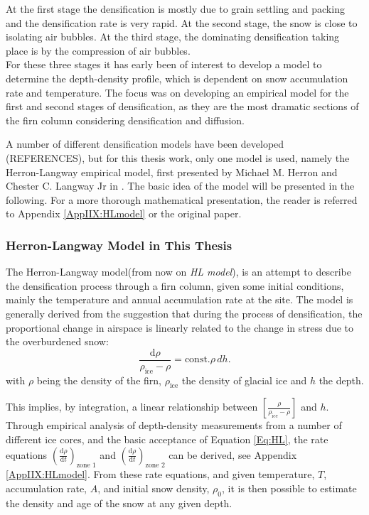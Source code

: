 \documentclass[../../CompleteThesis2/Complete_2ndDraft]{subfiles}
\begin{document}
At the first stage the densification is mostly due to grain settling and packing and the densification rate is very rapid. At the second stage, the snow is close to isolating air bubbles. At the third stage, the dominating densification taking place is by the compression of air bubbles.\\
For these three stages it has early been of interest to develop a model to determine the depth-density profile, which is dependent on snow accumulation rate and temperature. The focus was on developing an empirical model for the first and second stages of densification, as they are the most dramatic sections of the firn column considering densification and diffusion.

A number of different densification models have been developed (REFERENCES),  but for this thesis work, only one model is used, namely the Herron-Langway empirical model, first presented by Michael M. Herron and Chester C. Langway Jr in \cite[Herron and Langway, 1980]{HerronLangway1980}. The basic idea of the model will be presented in the following. For a more thorough mathematical presentation, the reader is referred to Appendix \ref{AppIIX:HLmodel} or the original paper.

\subsubsection[HL in This Thesis]{Herron-Langway Model in This Thesis}
\label{Subsubsec:Ice_DiffusionAndDensification_Densification_HLmodel}
The Herron-Langway model(from now on \textit{HL model}), is an attempt to describe the densification process through a firn column, given some initial conditions, mainly the temperature and annual accumulation rate at the site. The model is generally derived from the suggestion that during the process of densification, the proportional change in airspace is linearly related to the change in stress due to the overburdened snow:
\begin{equation}
	\frac{\text{d}\rho}{\rho_{\text{ice}} - \rho} = \text{const.} \rho \, dh.
	\label{Eq:HL}
\end{equation}
with $\rho$ being the density of the firn, $\rho_{\text{ice}}$ the density of glacial ice and $h$ the depth.

This implies, by integration, a linear relationship between $\left[\frac{\rho}{\rho_{\text{ice}} - \rho}\right]$ and $h$. Through empirical analysis of depth-density measurements from a number of different ice cores, and the basic acceptance of Equation \ref{Eq:HL}, the rate equations $\left(\frac{\text{d}\rho}{\text{d}t}\right)_{\text{zone 1}}$ and $\left(\frac{\text{d}\rho}{\text{d}t}\right)_{\text{zone 2}}$ can be derived, see Appendix \ref{AppIIX:HLmodel}. From these rate equations, and given temperature, $T$, accumulation rate, $A$, and initial snow density, $\rho_0$, it is then possible to estimate the density and age of the snow at any given depth. 
\end{document}
